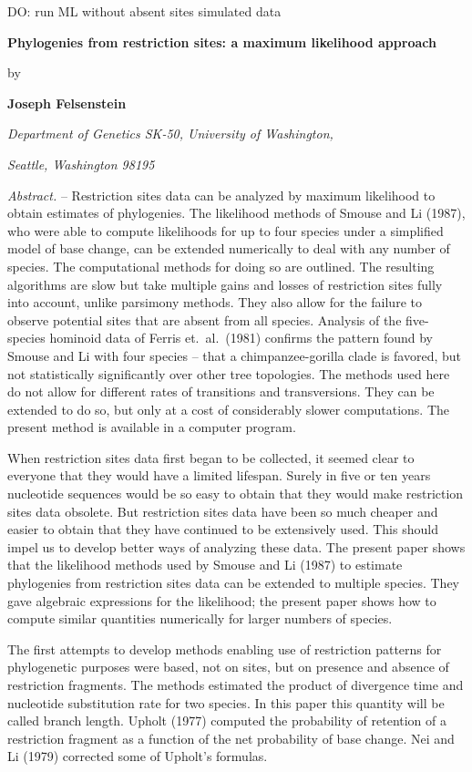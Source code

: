{DO:  run ML without absent sites
     simulated data}
\def\baselinestretch{1.5}


\centerline{\bf Phylogenies from restriction sites: a maximum likelihood approach}
\medskip

\centerline{by}
\medskip

\centerline{\bf Joseph Felsenstein}
\medskip

\centerline{\it Department of Genetics SK-50, University of Washington,}
\centerline{\it Seattle, Washington 98195}
\bigskip

{\it Abstract.} -- Restriction sites data can be analyzed by maximum likelihood to
obtain estimates of phylogenies.  The likelihood methods of Smouse and Li
(1987), who were able to compute likelihoods for up to four species under a
simplified model of base change, can be extended numerically to deal with
any number of species.  The computational methods for doing so are outlined.
The resulting algorithms are slow but take multiple gains and losses of
restriction sites fully into account, unlike parsimony methods. They also
allow for the failure to observe potential sites that are absent from all
species.  Analysis of the five-species hominoid data of Ferris et.~al.~(1981)
confirms the pattern
found by Smouse and Li with four species -- that a chimpanzee-gorilla clade
is favored, but not statistically significantly over other tree topologies.
The methods used here do not allow for different rates of transitions and
transversions.  They can be extended to do so, but only at a cost of
considerably slower computations.  The present method is available in a
computer program.

\newpage

When restriction sites data first began to be collected, it seemed clear to
everyone that they would have a limited lifespan.  Surely in five or ten
years nucleotide sequences would be so easy to obtain that they would make
restriction sites data obsolete.  But restriction sites data have been
so much cheaper and easier to obtain that they have continued to be
extensively used.  This should impel us to develop better ways of analyzing
these data.  The present paper shows that the likelihood methods used by Smouse
and Li (1987) to estimate phylogenies from restriction sites data
can be extended to multiple species.  They gave algebraic
expressions for the likelihood; the present paper shows how to compute similar
quantities numerically for larger numbers of species.

The first attempts to develop methods enabling use of restriction patterns for
phylogenetic purposes were based, not on sites, but on presence and absence
of restriction fragments.  The methods estimated the product of divergence
time and nucleotide substitution rate for two species.  In this paper this
quantity will be called branch length.  Upholt (1977) computed the probability
of retention of a restriction fragment as a function of the net probability of
base change.  Nei and Li (1979) corrected some of Upholt's formulas.  

